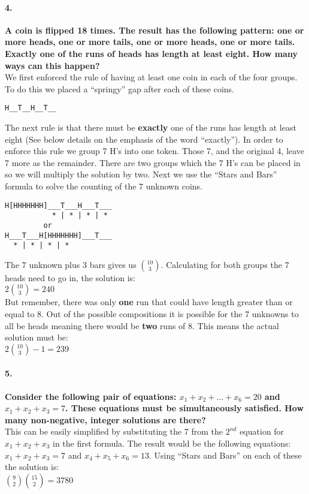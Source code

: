 \documentclass{article}
\begin{document}
\paragraph{4. }
\textbf{A coin is flipped 18 times. The result has the following pattern: one or more heads, one or more tails, one or more heads, one or more tails. Exactly one of the runs of heads has length at least eight. How many ways can this happen?}\\
We first enforced the rule of having at least one coin in each of the four groups. To do this we placed a ``springy'' gap after each of these coins.
\begin{verbatim}
H__T__H__T__
\end{verbatim}
The next rule is that there must be \textbf{exactly} one of the runs has length at least eight (See below details on the emphasis of the word ``exactly'').
In order to enforce this rule we group 7 H's into one token. Those 7, and the original 4, leave 7 more as the remainder. There are two groups which the 7 H's can be placed in so we will multiply the solution by two. Next we use the ``Stars and Bars'' formula to solve the counting of the 7 unknown coins.
\begin{verbatim}
H[HHHHHHH]___T___H___T___
           * | * | * | *
         or
H___T___H[HHHHHHH]___T___
  * | * | * | *
\end{verbatim}
The 7 unknown plus 3 bars gives us ${10 \choose 3}$. Calculating for both groups the 7 heads need to go in, the solution is:\\
$2{10 \choose 3} = 240$\\
But remember, there was only \textbf{one} run that could have length greater than or equal to 8. Out of the possible compositions it is possible for the 7 unknowns to all be heads meaning there would be \textbf{two} runs of 8. This means the actual solution must be:\\
$\boxed{2{10 \choose 3} - 1 = 239}$

\paragraph{5. }
\textbf{Consider the following pair of equations: $x_1 + x_2 + . . . + x_6 = 20$ and $x_1 + x_2 + x_3 = 7$. These equations must be simultaneously satisfied. How many non-negative, integer solutions are there?}\\
This can be easily simplified by substituting the 7 from the $2^{nd}$ equation for $x_1+x_2+x_3$ in the first formula. The result would be the following equations:\\
$x_1+x_2+x_3 = 7$ and $x_4+x_5+x_6 = 13$.
Using ``Stars and Bars'' on each of these the solution is:\\
 $\boxed{{9 \choose 2}{15 \choose 2} = 3780}$
\end{document}
